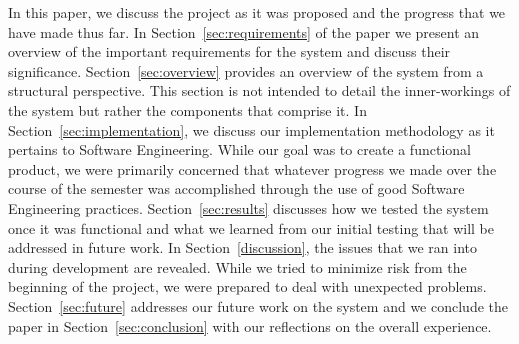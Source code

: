 In this paper, we discuss the project as it was proposed and the
progress that we have made thus far.  In
Section~\ref{sec:requirements} of the paper we present an overview of
the important requirements for the system and discuss their
significance.  Section~\ref{sec:overview} provides an overview of the
system from a structural perspective.  This section is not intended to
detail the inner-workings of the system but rather the components that
comprise it.  In Section~\ref{sec:implementation}, we discuss our
implementation methodology as it pertains to Software Engineering.
While our goal was to create a functional product, we were primarily
concerned that whatever progress we made over the course of the
semester was accomplished through the use of good Software Engineering
practices. Section~\ref{sec:results} discusses how we tested the
system once it was functional and what we learned from our initial
testing that will be addressed in future work.  In
Section~\ref{discussion}, the issues that we ran into during
development are revealed.  While we tried to minimize risk from the
beginning of the project, we were prepared to deal with unexpected
problems.  Section~\ref{sec:future} addresses our future work on the
system and we conclude the paper in Section~\ref{sec:conclusion} with
our reflections on the overall experience.
